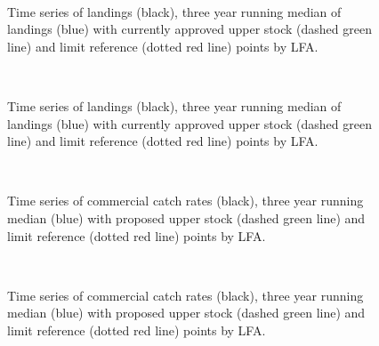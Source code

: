 \documentclass[11pt]{article}
\newcommand{\e}{/backup/bio_data/bio.lobster/figures/} %
\begin{document}
\begin{figure}
        \centering
         \\
                    \caption{Time series of landings (black), three year running median of landings (blue) with currently approved upper stock (dashed green line) and limit reference (dotted red line) points by LFA.}
        \end{figure}

\begin{figure}
        \centering
         \\
                    \caption{Time series of landings (black), three year running median of landings (blue) with currently approved upper stock (dashed green line) and limit reference (dotted red line) points by LFA.}
        \end{figure}




\begin{figure}
        \centering
         \\
                    \caption{Time series of commercial catch rates (black), three year running median (blue) with proposed upper stock (dashed green line) and limit reference (dotted red line) points by LFA.}
        \end{figure}

\begin{figure}
        \centering
         \\
                    
                    \caption{Time series of commercial catch rates (black), three year running median (blue) with proposed upper stock (dashed green line) and limit reference (dotted red line) points by LFA.}
        \end{figure}
\end{document}
